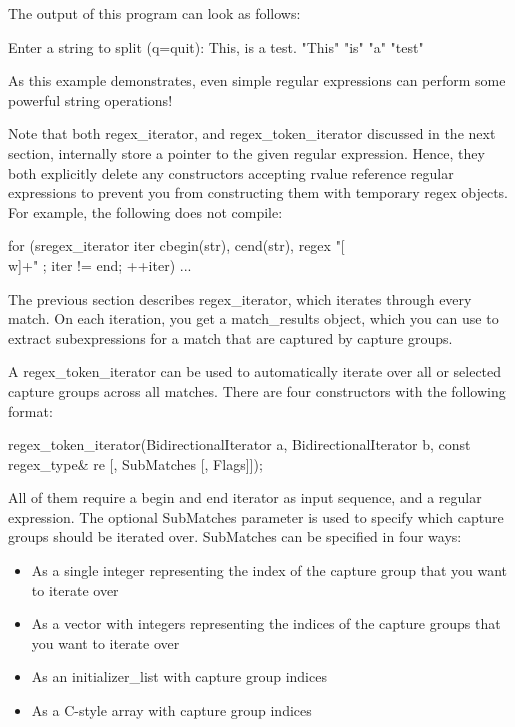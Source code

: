 The output of this program can look as follows:

\begin{shell}
Enter a string to split (q=quit): This, is a test.
"This"
"is"
"a"
"test"
\end{shell}

As this example demonstrates, even simple regular expressions can perform some powerful string operations!

Note that both regex\_iterator, and regex\_token\_iterator discussed in the next section, internally store a pointer to the given regular expression. Hence, they both explicitly delete any constructors accepting rvalue reference regular expressions to prevent you from constructing them with temporary regex objects. For example, the following does not compile:

\begin{cpp}
for (sregex_iterator iter { cbegin(str), cend(str), regex { "[\\w]+" } };
    iter != end; ++iter) { ... }
\end{cpp}


The previous section describes regex\_iterator, which iterates through every match. On each iteration, you get a match\_results object, which you can use to extract subexpressions for a match that are captured by capture groups.

A regex\_token\_iterator can be used to automatically iterate over all or selected capture groups across all matches. There are four constructors with the following format:

\begin{cpp}
regex_token_iterator(BidirectionalIterator a,
                     BidirectionalIterator b,
                     const regex_type& re
                     [, SubMatches
                     [, Flags]]);
\end{cpp}

All of them require a begin and end iterator as input sequence, and a regular expression. The optional SubMatches parameter is used to specify which capture groups should be iterated over. SubMatches can be specified in four ways:

\begin{itemize}
\item
As a single integer representing the index of the capture group that you want to iterate over

\item
As a vector with integers representing the indices of the capture groups that you want to iterate over

\item
As an initializer\_list with capture group indices

\item
As a C-style array with capture group indices
\end{itemize}


